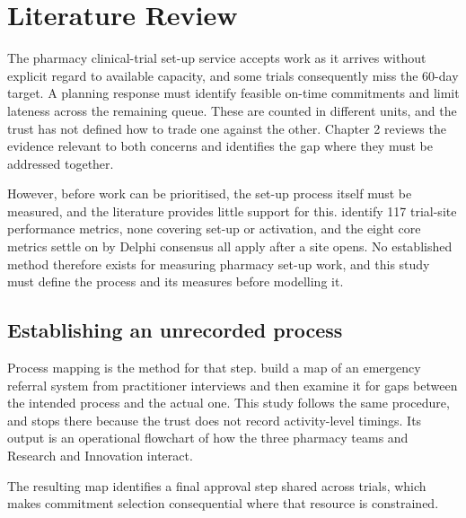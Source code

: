 
\chapter{Literature Review}
\label{ch:litreview}

The pharmacy clinical-trial set-up service accepts work as it arrives without explicit regard to available capacity, and some trials consequently miss the 60-day target. A planning response must identify feasible on-time commitments and limit lateness across the remaining queue. These are counted in different units, and the trust has not defined how to trade one against the other. Chapter 2 reviews the evidence relevant to both concerns and identifies the gap where they must be addressed together.

However, before work can be prioritised, the set-up process itself must be measured, and the literature provides little support for this. \citet{Walker2018Metrics} identify 117 trial-site performance metrics, none covering set-up or activation, and the eight core metrics \citet{Whitham2018Metrics} settle on by Delphi consensus all apply after a site opens. No established method therefore exists for measuring pharmacy set-up work, and this study must define the process and its measures before modelling it.

\section{Establishing an unrecorded process}
\label{sec:mapping}

Process mapping is the method for that step. \citet{Ofosu2021ProcessMapping} build a map of an emergency referral system from practitioner interviews and then examine it for gaps between the intended process and the actual one. This study follows the same procedure, and stops there because the trust does not record activity-level timings. Its output is an operational flowchart of how the three pharmacy teams and Research and Innovation interact.

The resulting map identifies a final approval step shared across trials, which makes commitment selection consequential where that resource is constrained.

